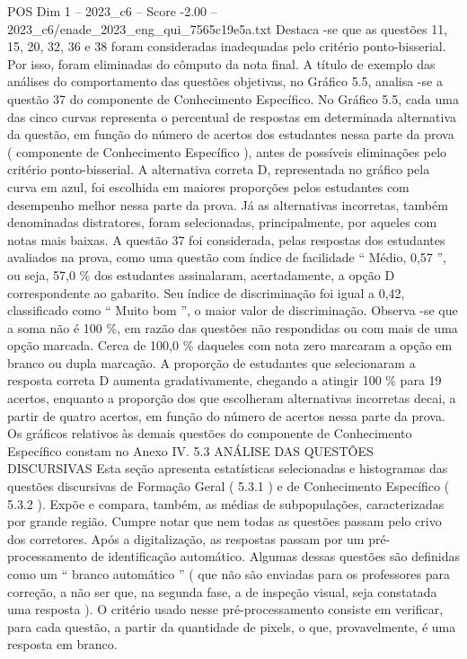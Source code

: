 \begin{textsample}{POS Dim 1 – 2023\_c6 – Score -2.00 – 2023\_c6/enade\_2023\_eng\_qui\_7565c19e5a.txt}
Destaca -se que as questões 11, 15, 20, 32, 36 e 38 foram consideradas inadequadas pelo critério ponto-bisserial.
Por isso, foram eliminadas do cômputo da nota final.
A título de exemplo das análises do comportamento das questões objetivas, no Gráfico 5.5, analisa -se a questão 37 do componente de Conhecimento Específico.
No Gráfico 5.5, cada uma das cinco curvas representa o percentual de respostas em determinada alternativa da questão, em função do número de acertos dos estudantes nessa parte da prova ( componente de Conhecimento Específico ), antes de possíveis eliminações pelo critério ponto-bisserial.
A alternativa correta D, representada no gráfico pela curva em azul, foi escolhida em maiores proporções pelos estudantes com desempenho melhor nessa parte da prova.
Já as alternativas incorretas, também denominadas distratores, foram selecionadas, principalmente, por aqueles com notas mais baixas.
A questão 37 foi considerada, pelas respostas dos estudantes avaliados na prova, como uma questão com índice de facilidade “ Médio, 0,57 ”, ou seja, 57,0 \% dos estudantes assinalaram, acertadamente, a opção D correspondente ao gabarito.
Seu índice de discriminação foi igual a 0,42, classificado como “ Muito bom ”, o maior valor de discriminação.
Observa -se que a soma não é 100 \%, em razão das questões não respondidas ou com mais de uma opção marcada.
Cerca de 100,0 \% daqueles com nota zero marcaram a opção em branco ou dupla marcação.
A proporção de estudantes que selecionaram a resposta correta D aumenta gradativamente, chegando a atingir 100 \% para 19 acertos, enquanto a proporção dos que escolheram alternativas incorretas decai, a partir de quatro acertos, em função do número de acertos nessa parte da prova.
Os gráficos relativos às demais questões do componente de Conhecimento Específico constam no Anexo IV. 5.3 ANÁLISE DAS QUESTÕES DISCURSIVAS Esta seção apresenta estatísticas selecionadas e histogramas das questões discursivas de Formação Geral ( 5.3.1 ) e de Conhecimento Específico ( 5.3.2 ).
Expõe e compara, também, as médias de subpopulações, caracterizadas por grande região.
Cumpre notar que nem todas as questões passam pelo crivo dos corretores.
Após a digitalização, as respostas passam por um pré-processamento de identificação automático.
Algumas dessas questões são definidas como um “ branco automático ” ( que não são enviadas para os professores para correção, a não ser que, na segunda fase, a de inspeção visual, seja constatada uma resposta ).
O critério usado nesse pré-processamento consiste em verificar, para cada questão, a partir da quantidade de pixels, o que, provavelmente, é uma resposta em branco.

\end{textsample}
